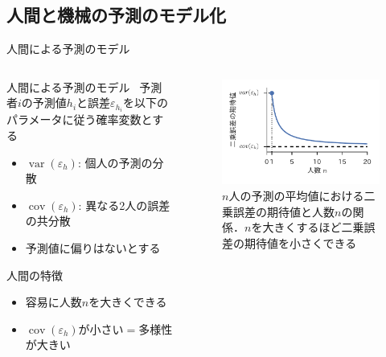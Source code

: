 \documentclass[dvipdfmx,aspectratio=169]{beamer}
\DeclareMathOperator{\var}{var}
\DeclareMathOperator{\cov}{cov}
\newcommand{\varh}{\var(\varepsilon_h)}
\newcommand{\covh}{\cov(\varepsilon_h)}
\begin{document}
\subsection{人間と機械の予測のモデル化}

\begin{frame}{人間による予測のモデル}
  \begin{columns}
    \begin{column}{0.5\textwidth}
      \begin{block}{人間による予測のモデル~\cite{Lamberson2012}}
        予測者$i$の予測値$h_i$と誤差$\varepsilon_{h_i}$を以下のパラメータに従う確率変数とする
        \begin{itemize}
          \item $\varh$: 個人の予測の分散
          \item $\covh$: 異なる2人の誤差の共分散
          \item 予測値に偏りはないとする
        \end{itemize}
      \end{block}
      \begin{alertblock}{人間の特徴}
        \begin{itemize}
          \item 容易に人数$n$を大きくできる
          \item $\covh$が小さい$=$多様性が大きい
        \end{itemize}
      \end{alertblock}
    \end{column}
    \begin{column}{0.5\textwidth}
      \begin{figure}
        \centering
        \includegraphics[width=\columnwidth]{slide-humans_graph.pdf}
        \caption{$n$人の予測の平均値における二乗誤差の期待値と人数$n$の関係．$n$を大きくするほど二乗誤差の期待値を小さくできる}
      \end{figure}
    \end{column}
  \end{columns}
\end{frame}
\end{document}
